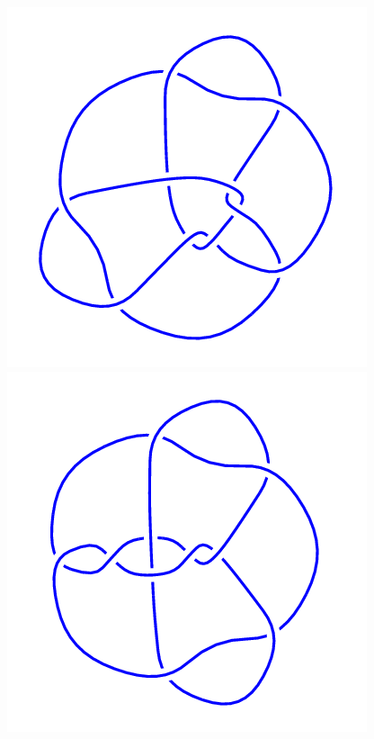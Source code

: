 \begin{figure}[H]
	\begin{minipage}[b]{.18\linewidth}
		\centering
		\includegraphics[width=\linewidth]{../data/10_157.png}
	\end{minipage}
	\begin{minipage}[b]{.18\linewidth}
		\centering
		\includegraphics[width=\linewidth]{../data/10_158.png}

\end{minipage}
\end{figure}

